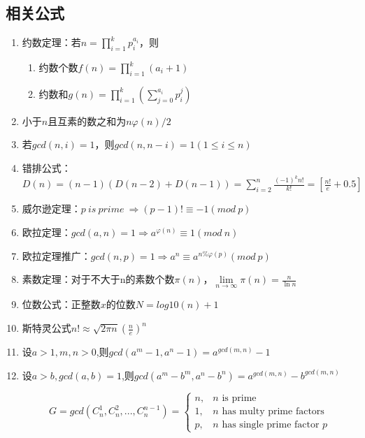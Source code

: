 \documentclass[a4]{article}
\begin{document}
\subsection{相关公式}
\begin{enumerate}
\item 约数定理：若$n=\prod_{i=1}^kp_i^{a_i}$，则

\begin{enumerate}
\item 约数个数$f(n)=\prod_{i=1}^k(a_i+1)$
\item 约数和$g(n)=\prod_{i=1}^k(\sum_{j=0}^{a_i}p_i^j)$
\end{enumerate}

\item 小于$n$且互素的数之和为$n\varphi(n)/2$

\item 若$gcd(n,i)=1$，则$gcd(n,n-i)=1(1\leq i\leq n)$

\item 错排公式：$D(n)=(n-1)(D(n-2)+D(n-1))=\sum_{i=2}^n\frac{(-1)^kn!}{k!}=[\frac{n!}{e}+0.5]$

\item 威尔逊定理：$p\ is\ prime\ \Rightarrow (p-1)!\equiv-1(mod\ p)$

\item 欧拉定理：$gcd(a,n)=1\Rightarrow a^{\varphi(n)}\equiv1(mod\ n)$

\item 欧拉定理推广：$gcd(n,p)=1\Rightarrow a^n\equiv a^{n\%\varphi(p)}(mod\ p)$

\item 素数定理：对于不大于n的素数个数$\pi(n)$，$\lim\limits_{n\to\infty}\pi(n)=\frac{n}{\ln n}$

\item 位数公式：正整数$x$的位数$N=log10(n)+1$

\item 斯特灵公式$n!\approx\sqrt{2\pi n}(\frac{n}{e})^n$

\item 设$a>1,m,n>0$,则$gcd(a^m-1,a^n-1)=a^{gcd(m,n)}-1$

\item 设$a>b,gcd(a,b)=1$,则$gcd(a^m-b^m,a^n-b^n)=a^{gcd(m,n)}-b^{gcd(m,n)}$

$$
G=gcd(C_n^1,C_n^2,...,C_n^{n-1})=
\begin{cases}
	n, & \text{$n$ is prime} \\
	1, & \text{$n$ has multy prime factors} \\
	p, & \text{$n$ has single prime factor $p$} 
\end{cases}
$$


\end{enumerate}
\end{document}
